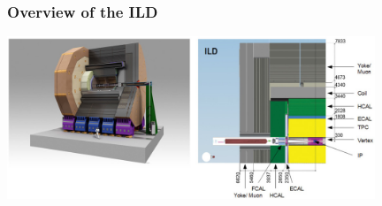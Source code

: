 \documentclass{beamer}
\begin{document}

\begin{frame}[plain]
    \frametitle{Overview of the ILD}

    \begin{center}
        \includegraphics[width = 11cm]{Pictures/ild-detector-ilc.jpg}
    \end{center}
\end{frame}






\end{document}
